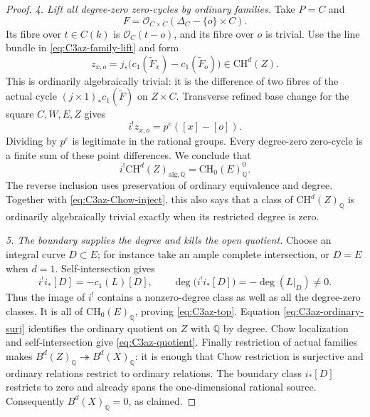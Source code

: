 \begin{proof}
\emph{4. Lift all degree-zero zero-cycles by ordinary families.}
Take $P=C$ and
\[
       F=\mathcal O_{C\times C}(\Delta_C-\{o\}\times C).
\]
Its fibre over $t\in C(k)$ is $\mathcal O_C(t-o)$, and its fibre
over $o$ is trivial. Use the line bundle in
\eqref{eq:C3az-family-lift} and form
\[
 z_{x,o}=j_*\bigl(c_1(\widetilde F_x)
                         -c_1(\widetilde F_o)\bigr)
                       \in\mathrm{CH}^d(Z).
\]
This is ordinarily algebraically trivial: it is the difference
of two fibres of the actual cycle
$(j\times1)_*c_1(\widetilde F)$ on $Z\times C$.
Transverse refined base change for the square $C,W,E,Z$ gives
\[
                       i^!z_{x,o}=p^e([x]-[o]).
\]
Dividing by $p^e$ is legitimate in the rational groups.
Every degree-zero zero-cycle is a finite sum of these point
differences. We conclude that
\begin{equation}\label{eq:C3az-ordinary-surj}
 i^!\mathrm{CH}^d(Z)_{\mathrm{alg},\mathbb Q}
                  =\mathrm{CH}_0(E)^0_{\mathbb Q}.
\end{equation}
The reverse inclusion uses preservation of ordinary equivalence
and degree. Together with \eqref{eq:C3az-Chow-inject}, this also
says that a class of $\mathrm{CH}^d(Z)_{\mathbb Q}$ is ordinarily
algebraically trivial exactly when its restricted degree is zero.

\emph{5. The boundary supplies the degree and kills the open quotient.}
Choose an integral curve $D\subset E$; for instance take an ample
complete intersection, or $D=E$ when $d=1$.
Self-intersection gives
\[
                  i^!i_*[D]=-c_1(L)[D],
             \qquad \deg\bigl(i^!i_*[D]\bigr)=-\deg(L|_D)\ne0.
\]
Thus the image of $i^!$ contains a nonzero-degree class as well as
all the degree-zero classes. It is all of
$\mathrm{CH}_0(E)_{\mathbb Q}$, proving \eqref{eq:C3az-top}.
Equation \eqref{eq:C3az-ordinary-surj} identifies the ordinary
quotient on $Z$ with $\mathbb Q$ by degree. Chow localization and
self-intersection give \eqref{eq:C3az-quotient}.
Finally restriction of actual families makes $B^d(Z)_{\mathbb Q}
\twoheadrightarrow B^d(X)_{\mathbb Q}$: it is enough that Chow
restriction is surjective and ordinary relations restrict to
ordinary relations. The boundary class $i_*[D]$ restricts to zero
and already spans the one-dimensional rational source. Consequently
$B^d(X)_{\mathbb Q}=0$, as claimed.
\end{proof}
